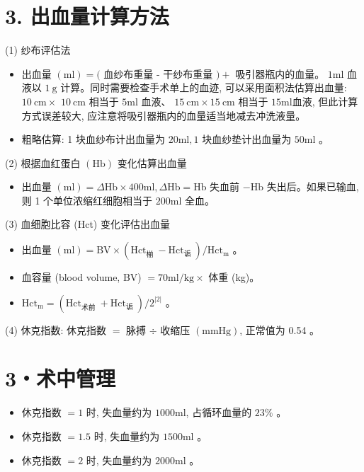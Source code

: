 \documentclass[10pt]{article}
\begin{document}
\section*{3. 出血量计算方法}
(1) 纱布评估法

\begin{itemize}
  \item 出血量 $(\mathrm{ml})=($ 血纱布重量 - 干纱布重量 $)+$ 吸引器瓶内的血量。 $1 \mathrm{ml}$ 血液以 $1 \mathrm{~g}$ 计算。同时需要检查手术单上的血迹, 可以采用面积法估算出血量: $10 \mathrm{~cm} \times$ $10 \mathrm{~cm}$ 相当于 $5 \mathrm{ml}$ 血液、 $15 \mathrm{~cm} \times 15 \mathrm{~cm}$ 相当于 $15 \mathrm{ml}$血液, 但此计算方式误差较大, 应注意将吸引器瓶内的血量适当地减去冲洗液量。
  \item 粗略估算: 1 块血纱布计出血量为 $20 \mathrm{ml}, 1$ 块血纱垫计出血量为 $50 \mathrm{ml}$ 。
\end{itemize}

(2) 根据血红蛋白 $(\mathrm{Hb})$ 变化估算出血量

\begin{itemize}
  \item 出血量 $(\mathrm{ml})=\Delta \mathrm{Hb} \times 400 \mathrm{ml}, \Delta \mathrm{Hb}=\mathrm{Hb}$ 失血前 $-\mathrm{Hb}$ 失出后。如果已输血, 则 1 个单位浓缩红细胞相当于 $200 \mathrm{ml}$ 全血。
\end{itemize}

(3) 血细胞比容 (Hct) 变化评估出血量

\begin{itemize}
  \item 出血量 $(\mathrm{ml})=\mathrm{BV} \times\left(\mathrm{Hct}_{\text {椾 }}-\mathrm{Hct}_{\text {诟 }}\right) / \mathrm{Hct}_{\mathrm{m}}$ 。
  \item 血容量 (blood volume, BV) $=70 \mathrm{ml} / \mathrm{kg} \times$ 体重 (kg)。
  \item $\mathrm{Hct}_{\mathrm{m}}=\left(\mathrm{Hct}_{\text {术前 }}+\mathrm{Hct}_{\text {诟 }}\right) / 2^{|2|}$ 。
\end{itemize}

(4) 休克指数: 休克指数 $=$ 脉搏 $\div$ 收缩压 $(\mathrm{mmHg})$, 正常值为 0.54 。

\section*{3・术中管理}
\begin{itemize}
  \item 休克指数 $=1$ 时, 失血量约为 $1000 \mathrm{ml}$, 占循环血量的 $23 \%$ 。
  \item 休克指数 $=1.5$ 时, 失血量约为 $1500 \mathrm{ml}$ 。
  \item 休克指数 $=2$ 时, 失血量约为 $2000 \mathrm{ml}$ 。
\end{itemize}
\end{document}
